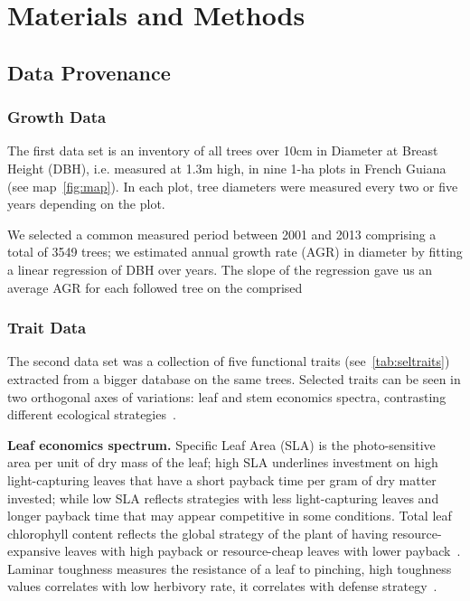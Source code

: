 \section*{Materials and Methods}
\label{sec:M&M}

\subsection*{Data Provenance}

\subsubsection*{Growth Data}
The first data set is an inventory of all trees over 10cm in Diameter at Breast Height (DBH), i.e. measured at 1.3m high, in nine 1-ha plots in French Guiana (see map~\autoref{fig:map}). In each plot, tree diameters were measured every two or five years depending on the plot.

We selected a common measured period between 2001 and 2013 comprising a total of 3549 trees; we estimated annual growth rate (AGR) in diameter by fitting a linear regression of DBH over years. The slope of the regression gave us an average AGR for each followed tree on the comprised 


\subsubsection*{Trait Data}

The second data set was a collection of five functional traits (see~\autoref{tab:seltraits}) extracted from a bigger database \citep{baraloto_decoupled_2010} on the same trees. Selected traits can be seen in two orthogonal axes of variations: leaf and stem economics spectra, contrasting different ecological strategies~\citep{westoby_leaf-height-seed_1998, baraloto_decoupled_2010}.

\textbf{Leaf economics spectrum.} Specific Leaf Area (SLA) is the photo-sensitive area per unit of dry mass of the leaf; high SLA underlines investment on high light-capturing leaves that have a short payback time per gram of dry matter invested; while low SLA reflects strategies with less light-capturing leaves and longer payback time that may appear competitive in some conditions. Total leaf chlorophyll content reflects the global strategy of the plant of having resource-expansive leaves with high payback or resource-cheap leaves with lower payback~\citep{coste_assessing_2010}. Laminar toughness measures the resistance of a leaf to pinching, high toughness values correlates with low herbivory rate, it correlates with defense strategy~\citep{westoby_leaf-height-seed_1998}.

